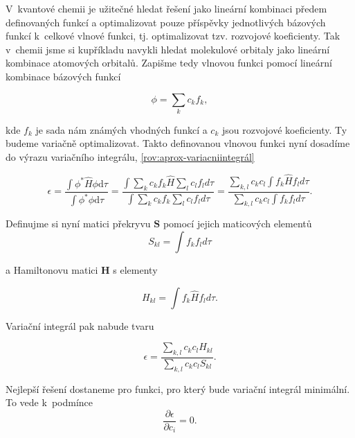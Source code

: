  V~kvantové chemii je užitečné hledat řešení jako lineární kombinaci předem definovaných funkcí a optimalizovat pouze příspěvky jednotlivých bázových funkcí k~celkové vlnové funkci, tj. optimalizovat tzv. rozvojové koeficienty. Tak v~chemii jsme si kupříkladu navykli hledat molekulové orbitaly jako lineární kombinace atomových orbitalů. Zapišme tedy vlnovou funkci pomocí lineární kombinace bázových funkcí
 
 \begin{equation}
 \phi=\sum_k c_k f_k,
 \label{rov:aprox-Rayleigh-Ritz} 
 \end{equation}
 
\noindent kde $ f_k $ je sada nám známých vhodných funkcí a $ c_k $ jsou rozvojové koeficienty. Ty budeme variačně optimalizovat. Takto definovanou vlnovou funkci nyní dosadíme do výrazu variačního integrálu, \ref{rov:aprox-variacniintegrál}
 
 \begin{equation}
\epsilon = \frac{\int \phi^{\ast}\hat{H}\phi \mathrm{d} \tau}{\int \phi^{\ast} \phi \mathrm{d} \tau}=\frac{\int\sum_k c_k f_k\hat{H}\sum_l c_l f_l d\tau}{\int\sum_k c_k f_k\sum_l c_l f_l d\tau}=\frac{\sum_{k,l} c_k c_l \int f_k \hat{H} f_ld\tau}{\sum_{k,l} c_k c_l \int f_k f_ld\tau}.
\label{rov:aprox-variacniintegrál2}
\end{equation}
 
 \noindent Definujme si nyní matici překryvu $\mathbf{S}$ pomocí jejich maticových elementů
 \begin{equation}
 S_{kl}=\int f_k f_ld\tau
\end{equation}  
 
\noindent  a Hamiltonovu matici $\mathbf{H}$ s elementy
 
  \begin{equation}
 H_{kl}=\int f_k \hat{H} f_ld\tau.
\end{equation}  
 
 \noindent Variační integrál pak nabude tvaru
 
   \begin{equation}
 \epsilon=\frac{\sum_{k,l}c_k c_l H_{kl}}{\sum_{k,l}c_k c_l S_{kl}}.
\end{equation}  
 
 \noindent Nejlepší řešení dostaneme pro funkci, pro který bude variační integrál minimální. To vede k~podmínce
 \begin{equation}
 \frac{\partial \epsilon}{\partial c_i}=0.
 \label{rov:aprox-derivace} 
 \end{equation}
 
